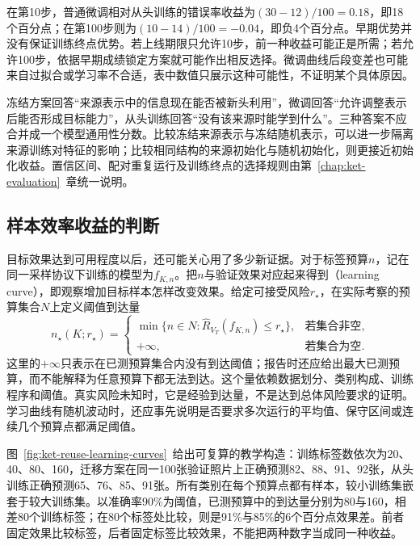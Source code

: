 在第10步，普通微调相对从头训练的错误率收益为$(30-12)/100=0.18$，即18个百分点；在第100步则为$(10-14)/100=-0.04$，即负4个百分点。早期优势并没有保证训练终点优势。若上线期限只允许10步，前一种收益可能正是所需；若允许100步，依据早期成绩锁定方案就可能作出相反选择。微调曲线后段变差也可能来自过拟合或学习率不合适，表中数值只展示这种可能性，不证明某个具体原因。

冻结方案回答“来源表示中的信息现在能否被新头利用”，微调回答“允许调整表示后能否形成目标能力”，从头训练回答“没有该来源时能学到什么”。三种答案不应合并成一个模型通用性分数。比较冻结来源表示与冻结随机表示，可以进一步隔离来源训练对特征的影响；比较相同结构的来源初始化与随机初始化，则更接近初始化收益。置信区间、配对重复运行及训练终点的选择规则由第~\ref{chap:ket-evaluation}~章统一说明。

\subsection{样本效率收益的判断}
\label{sec:ket-reuse-sample-efficiency}

目标效果达到可用程度以后，还可能关心用了多少新证据。对于标签预算$n$，记在同一采样协议下训练的模型为$f_{K,n}$。把$n$与验证效果对应起来得到（learning curve），即观察增加目标样本怎样改变效果。给定可接受风险$r_\star$，在实际考察的预算集合$N$上定义阈值到达量
\begin{equation}
  n_\star(K;r_\star)
  =
  \begin{cases}
    \min\{n\in N:\hat R_{V_T}(f_{K,n})\leq r_\star\},
      & \text{若集合非空},\\
    +\infty, & \text{若集合为空}.
  \end{cases}
  \label{eq:ket-reuse-label-threshold}
\end{equation}
这里的$+\infty$只表示在已测预算集合内没有到达阈值；报告时还应给出最大已测预算，而不能解释为任意预算下都无法到达。这个量依赖数据划分、类别构成、训练程序和阈值。真实风险未知时，它是经验到达量，不是达到总体风险要求的证明。学习曲线有随机波动时，还应事先说明是否要求多次运行的平均值、保守区间或连续几个预算点都满足阈值。

图~\ref{fig:ket-reuse-learning-curves}~给出可复算的教学构造：训练标签数依次为20、40、80、160，迁移方案在同一100张验证照片上正确预测82、88、91、92张，从头训练正确预测65、76、85、91张。所有类别在每个预算点都有样本，较小训练集嵌套于较大训练集。以准确率90\%为阈值，已测预算中的到达量分别为80与160，相差80个训练标签；在80个标签处比较，则是91\%与85\%的6个百分点效果差。前者固定效果比较标签，后者固定标签比较效果，不能把两种数字当成同一种收益。

